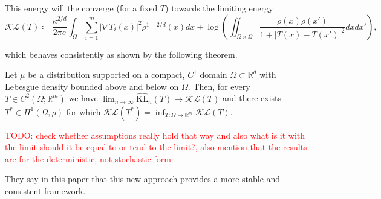 This energy will the converge (for a fixed $T$) towards the limiting energy 
\begin{equation*}
    \mathcal{K}\mathcal{L} (T) \coloneq \frac{\kappa^{2/d}}{2 \pi e} \int_\Omega \sum_{i=1}^m |\nabla T_i(x)|^2 \rho^{1-2/d} (x) d x + \log\left( \iint_{\Omega \times \Omega} \frac{\rho(x)\rho(x')}{1+ |T(x)-T(x')|^2}  d x d x' \right), 
\end{equation*}

which behaves consistently as shown by the following theorem. 

\begin{thm}
    Let $\mu$ be a distribution supported on a compact, $C^1$ domain $\Omega \subset \mathbb{R}^d$ with Lebesgue density bounded above and below on $\Omega$. 
    Then, for every $T \in C^2(\Omega; \mathbb{R}^m)$ we have $\lim_{n \to \infty} \hat{\text{KL}}_n(T) \to \mathcal{K}\mathcal{L} (T)$
    and there exists $T^* \in H^1(\Omega, \rho)$ for which $\mathcal{K}\mathcal{L} (T^*) = \inf_{T: \Omega \to \mathbb{R}^m} \mathcal{K}\mathcal{L} (T)$.  
\end{thm}

\textcolor{red}{TODO: check whether assumptions really hold that way and also what is it with the limit should it be equal to or tend to the limit?, also mention that the results are for the deterministic, not stochastic form}

They say in this paper that this new approach provides a more stable and consistent framework. 